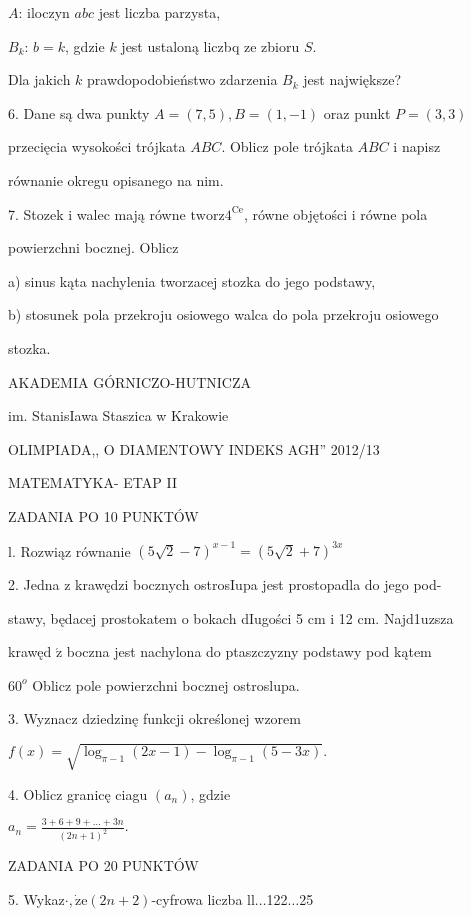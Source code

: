 \documentclass[a4paper,12pt]{article}
\begin{document}
$A$: iloczyn $abc$ jest liczba parzysta,

$B_{k}$: $b=k$, gdzie $k$ jest ustaloną liczbq ze zbioru $S.$

Dla jakich $k$ prawdopodobieństwo zdarzenia $B_{k}$ jest największe?

6. Dane są dwa punkty $A = (7,5), B = (1,-1)$ oraz punkt $P = (3,3)$

przecięcia wysokości trójkata $ABC$. Oblicz pole trójkata $ABC$ i napisz

równanie okregu opisanego na nim.

7. Stozek i walec mają równe $\mathrm{t}\mathrm{w}\mathrm{o}\mathrm{r}\mathrm{z}4^{\mathrm{C}\mathrm{e}}$, równe objętości i równe pola

powierzchni bocznej. Oblicz

a) sinus kąta nachylenia tworzacej stozka do jego podstawy,

b) stosunek pola przekroju osiowego walca do pola przekroju osiowego

stozka.






AKADEMIA GÓRNICZO-HUTNICZA

im. StanisIawa Staszica w Krakowie

OLIMPIADA,, O DIAMENTOWY INDEKS AGH'' 2012/13

MATEMATYKA- ETAP II

ZADANIA PO 10 PUNKTÓW

l. Rozwiąz równanie $(5\sqrt{2}-7)^{x-1}=(5\sqrt{2}+7)^{3x}$

2. Jedna z krawędzi bocznych ostrosIupa jest prostopadla do jego pod-

stawy, będacej prostokatem o bokach dIugości 5 cm i 12 cm. Najd1uzsza

krawęd $\acute{\mathrm{z}}$ boczna jest nachylona do ptaszczyzny podstawy pod kątem

$60^{o}$ Oblicz pole powierzchni bocznej ostroslupa.

3. Wyznacz dziedzinę funkcji określonej wzorem

$f(x)=\sqrt{\log_{\pi-1}(2x-1)-\log_{\pi-1}(5-3x)}.$

4. Oblicz granicę ciagu $(a_{n})$, gdzie

$a_{n}=\displaystyle \frac{3+6+9+\ldots+3n}{(2n+1)^{2}}.$

ZADANIA PO 20 PUNKTÓW

5. Wykaz$\cdot, \dot{\mathrm{z}}\mathrm{e}(2n+2)$-cyfrowa liczba ll$\ldots$122$\ldots$25
\end{document}
